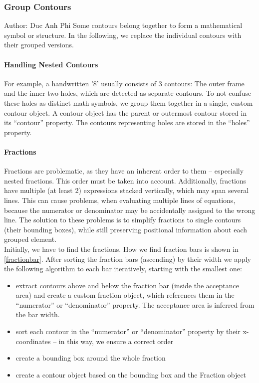 \documentclass[12pt]{article}
\begin{document}
	\subsubsection{Group Contours}
	\small{Author: Duc Anh Phi} \newline \newline
	Some contours belong together to form a mathematical symbol or structure. In the following, we replace the individual contours with their grouped versions.
	
	\paragraph{Handling Nested Contours}
	For example, a handwritten '8' usually consists of 3 contours: The outer frame and the inner two holes, which are detected as separate contours.
	To not confuse these holes as distinct math symbols, we group them together in a single, custom contour object.
	A contour object has the parent or outermost contour stored in its “contour” property.
	The contours representing holes are stored in the “holes” property.
	
	\paragraph{Fractions}
	Fractions are problematic, as they have an inherent order to them – especially nested fractions.
	This order must be taken into account. Additionally, fractions have multiple (at least 2) expressions stacked vertically, which may span several lines.
	This can cause problems, when evaluating multiple lines of equations, because the numerator or denominator may be accidentally assigned to the wrong line.
	The solution to these problems is to simplify fractions to single contours (their bounding boxes), while still preserving positional information about each grouped element.\\
	Initially, we have to find the fractions. How we find fraction bars is shown in \ref{fractionbar}. After sorting the fraction bars (ascending) by their width we apply the following algorithm to each bar iteratively, starting with the smallest one:
	\begin{itemize}
		\item extract contours above and below the fraction bar (inside the acceptance area) and create a custom fraction object, which references them in the “numerator” or “denominator” property. The acceptance area is inferred from the bar width.
		\item sort each contour in the “numerator” or “denominator” property by their x-coordinates – in this way, we ensure a correct order
		\item create a bounding box around the whole fraction
		\item create a contour object based on the bounding box and the Fraction object
	\end{itemize}
\end{document}
